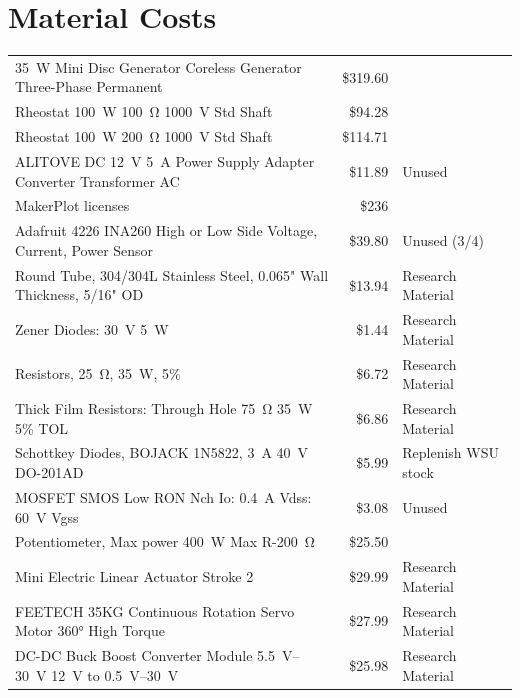 \documentclass[11pt,letterpaper,conference]{IEEEtran}
\begin{document}
\clearpage
\section{Material Costs}
\label{apx:costs}
\begin{table}[th]
    \centering
    \begin{NiceTabular}{lrl}
        \toprule
         &  &  \\
        \midrule
        \qty{35}{\W} Mini Disc Generator Coreless Generator Three-Phase Permanent &
        \$319.60 & \\
        Rheostat \qty{100}{\W} \qty{100}{\ohm} \qty{1000}{\volt} Std Shaft & \$94.28 & \\
        Rheostat \qty{100}{\W} \qty{200}{\ohm} \qty{1000}{\volt} Std Shaft & \$114.71 & \\
        ALITOVE DC \qty{12}{\V} \qty{5}{\A} Power Supply Adapter Converter Transformer AC & \$11.89 & Unused \\
        MakerPlot licenses & \$236 & \\
        Adafruit 4226 INA260 High or Low Side Voltage, Current, Power Sensor & \$39.80 & Unused (3/4) \\
        Round Tube, 304/304L Stainless Steel, 0.065" Wall Thickness, 5/16" OD & \$13.94 & Research Material \\
        Zener Diodes: \qty{30}{\V} \qty{5}{\W} & \$1.44 & Research Material \\
        Resistors, \qty{25}{\ohm}, \qty{35}{\W}, 5\% & \$6.72 & Research Material \\
        Thick Film Resistors: Through Hole \qty{75}{\ohm} \qty{35}{\W} 5\% TOL & \$6.86 & Research Material \\
        Schottkey Diodes, BOJACK 1N5822, \qty{3}{\A} \qty{40}{\V} DO-201AD & \$5.99 & Replenish WSU stock \\
        MOSFET SMOS Low RON Nch Io: \qty{0.4}{\A} Vdss: \qty{60}{\V} Vgss & \$3.08 & Unused \\
        Potentiometer, Max power \qty{400}{\W} Max R-\qty{200}{\ohm} & \$25.50 & \\
        Mini Electric Linear Actuator Stroke 2 & \$29.99 & Research Material \\
        FEETECH 35KG Continuous Rotation Servo Motor \ang{360} High Torque & \$27.99 & Research Material \\
        DC-DC Buck Boost Converter Module \qtyrange{5.5}{30}{\V} \qty{12}{\V} to \qtyrange{0.5}{30}{\V} & \$25.98 & Research Material \\

\end{NiceTabular}
\end{table}
\end{document}
